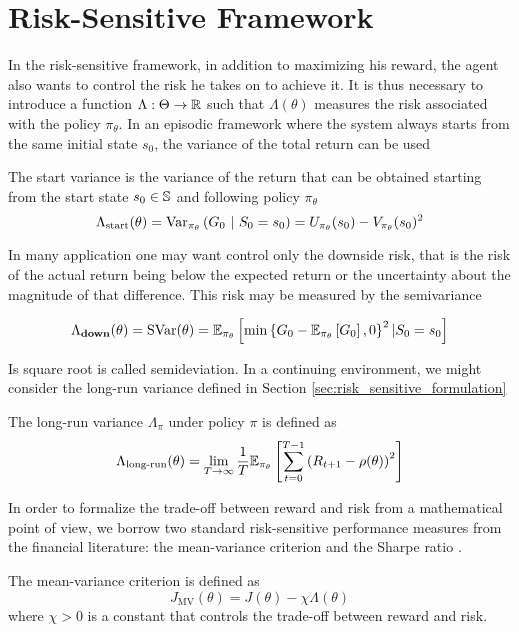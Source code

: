 \section{Risk-Sensitive Framework}
In the risk-sensitive framework, in addition to maximizing his reward, the agent also wants to control the risk he takes on to achieve it. It is thus necessary to introduce a function $\Lambda: \Theta \to \R$ such that $\Lambda(\theta)$ measures the risk associated with the policy $\pi_\theta$. In an episodic framework where the system always starts from the same initial state $s_0$, the variance of the total return can be used \cite{tamar2012policy}
\begin{definition}
	The start variance is the variance of the return that can be obtained starting from the start state $s_0 \in \S$ and following policy $\pi_\theta$
	\begin{equation}
		\Lambda_{\text{start}}(\theta) = \Var[\pi_\theta]{G_0\ |\ S_0 = s_0}
			= U_{\pi_\theta} (s_0) - V_{\pi_\theta} (s_0)^2 
	\end{equation}
\end{definition}
In many application one may want control only the downside risk, that is the risk of the actual return being below the expected return or the uncertainty about the magnitude of that difference. This risk may be measured by the semivariance
\begin{definition}[Semivariance]
	\begin{equation}
		\Lambda_\textbf{down}(\theta) = \text{SVar}(\theta) = \E[\pi_\theta]{\min\left\{G_0 - \E[\pi_\theta]{G_0}, 0\right\}^2 | S_0 = s_0}
	\end{equation}
\end{definition}	
Is square root is called semideviation. In a continuing environment, we might consider the long-run variance \cite{prashanth2014actor} defined in Section \ref{sec:risk_sensitive_formulation}
\begin{definition}
	The long-run variance $\Lambda_\pi$ under policy $\pi$ is defined as
	\begin{equation}
		\begin{split}
			\Lambda_{\text{long-run}}(\theta) &= \lim_{T \to \infty} \frac{1}{T} \E[\pi_\theta]{
			\sum^{T-1}_{t=0} \left(R_{t+1} - \rho(\theta)\right)^2}\\
		\end{split}
	\end{equation}
\end{definition}
In order to formalize the trade-off between reward and risk from a mathematical point of view, we borrow two standard risk-sensitive performance measures from the financial literature: the mean-variance criterion \cite{markowitz1952portfolio} and the Sharpe ratio \cite{sharpe1994sharpe}.
\begin{definition}
	The mean-variance criterion is defined as 
	\begin{equation}
		J_\text{MV}(\theta) = J(\theta) - \chi \Lambda(\theta)
	\end{equation}
	where $\chi > 0$ is a constant that controls the trade-off between reward and risk. 
\end{definition} 

